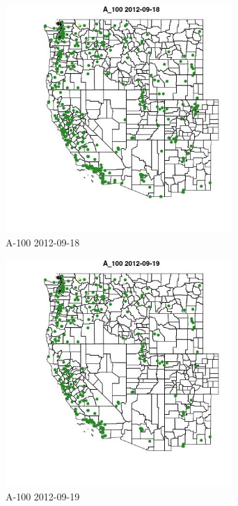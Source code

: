 \begin{figure} 
\centering  
\includegraphics[width=0.77\textwidth]{Code_Outputs/ML_input_report_ML_input_PM25_Step5_part_d_de_duplicated_aves_ML_input_MapObsA_1002012-09-18.jpg} 
\caption{\label{fig:ML_input_report_ML_input_PM25_Step5_part_d_de_duplicated_aves_ML_inputMapObsA_1002012-09-18}A-100 2012-09-18} 
\end{figure} 
 

\begin{figure} 
\centering  
\includegraphics[width=0.77\textwidth]{Code_Outputs/ML_input_report_ML_input_PM25_Step5_part_d_de_duplicated_aves_ML_input_MapObsA_1002012-09-19.jpg} 
\caption{\label{fig:ML_input_report_ML_input_PM25_Step5_part_d_de_duplicated_aves_ML_inputMapObsA_1002012-09-19}A-100 2012-09-19} 
\end{figure} 
 

